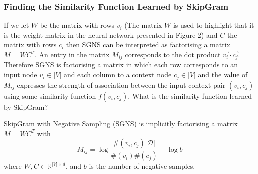 \documentclass[a4paper]{article}
\begin{document}
\subsubsection{Finding the Similarity Function Learned by SkipGram}
If we let $W$ be the matrix with rows $v_i$ (The matrix $W$ is used to highlight
that it is the weight matrix in the neural network presented in Figure 2) and $C$ the matrix with rows
$c_i$ then SGNS can be interpreted as factorising a matrix $M = WC^T$. An entry in the matrix $M_{ij}$ corresponds to the dot product $\vec{v_i} \cdot
\vec{c_j}$. Therefore SGNS is factorising a matrix in which each row corresponds
to an input node $v_i \in |V|$ and each column to a context node $c_j \in |V|$ and the value of $M_{ij}$ expresses the
strength of association between the input-context pair $(v_i, c_j)$ using some similarity
function $f(v_i,c_j)$. What is the similarity function learned by SkipGram? 
\begin{theorem}
  SkipGram with Negative Sampling (SGNS) is implicitly factorising a matrix $M =
  WC^T$ with
  \[M_{ij} = \log{\frac{\#(v_i,c_j)|\mathcal{D}|}{\#(v_i)\#(c_j)}} - \log{b}\]
  where $W, C \in \mathbb{R}^{|V| \times d}$, and $b$ is the number of negative samples.
\end{theorem}
\end{document}
